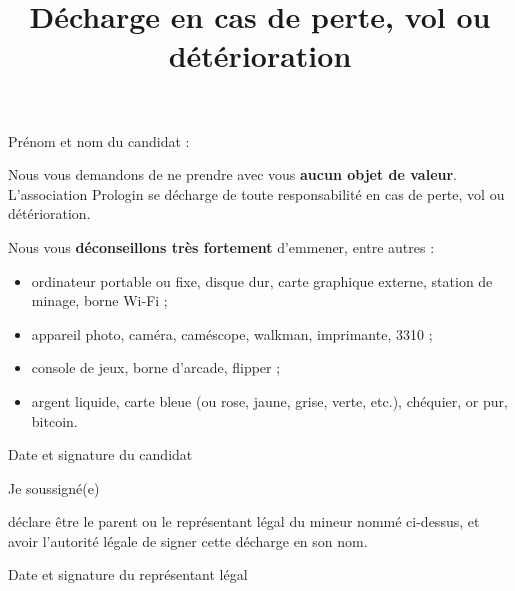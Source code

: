 \documentclass[a4paper,11pt]{prologin}
\title{Décharge en cas de perte, vol ou détérioration}
\begin{document}
Prénom et nom du candidat : \hrulefill

Nous vous demandons de ne prendre avec vous \textbf{aucun objet de valeur}.
L'association Prologin se décharge de toute responsabilité en cas de perte,
vol ou détérioration.

Nous vous \textbf{déconseillons très fortement} d'emmener, entre autres :
\begin{itemize}
\item ordinateur portable ou fixe, disque dur, carte graphique externe, station de minage, borne Wi-Fi ;
\item appareil photo, caméra, caméscope, walkman, imprimante, 3310 ;
\item console de jeux, borne d'arcade, flipper ;
\item argent liquide, carte bleue (ou rose, jaune, grise, verte, etc.), chéquier, or pur, bitcoin.
\end{itemize}\vspace{2mm}

\begin{signatureframe}{Date et signature du candidat}\end{signatureframe}

\begin{legalrepframe}[title=À remplir par le représentant légal si le candidat est mineur]
Je soussigné(e) \hrulefill

déclare être le parent ou le représentant légal du mineur nommé
ci-dessus, et avoir l'autorité légale de signer cette décharge en son nom.

\begin{signatureframe}{Date et signature du représentant légal}\end{signatureframe}


\end{legalrepframe}
\end{document}
